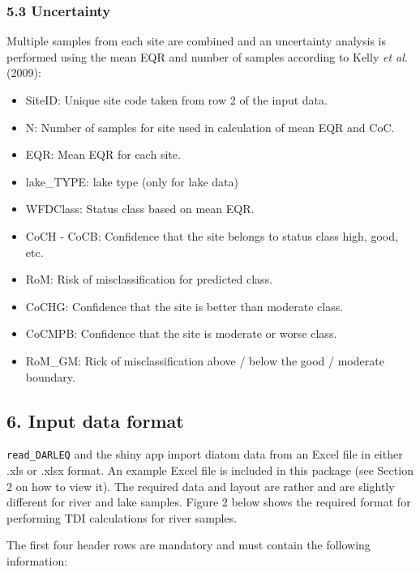 \documentclass[]{article}
\begin{document}
\hypertarget{uncertainty}{%
\subsubsection{5.3 Uncertainty}\label{uncertainty}}

Multiple samples from each site are combined and an uncertainty analysis
is performed using the mean EQR and number of samples according to Kelly
\emph{et al}. (2009):

\begin{itemize}
\item
  SiteID: Unique site code taken from row 2 of the input data.
\item
  N: Number of samples for site used in calculation of mean EQR and CoC.
\item
  EQR: Mean EQR for each site.
\item
  lake\_TYPE: lake type (only for lake data)
\item
  WFDClass: Status class based on mean EQR.
\item
  CoCH - CoCB: Confidence that the site belongs to status class high,
  good, etc.
\item
  RoM: Risk of misclassification for predicted class.
\item
  CoCHG: Confidence that the site is better than moderate class.
\item
  CoCMPB: Confidence that the site is moderate or worse class.
\item
  RoM\_GM: Rick of misclassification above / below the good / moderate
  boundary.
\end{itemize}

\hypertarget{input-data-format}{%
\subsection{6. Input data format}\label{input-data-format}}

\texttt{read\_DARLEQ} and the shiny app import diatom data from an Excel
file in either .xls or .xlsx format. An example Excel file is included
in this package (see Section 2 on how to view it). The required data and
layout are rather and are slightly different for river and lake samples.
Figure 2 below shows the required format for performing TDI calculations
for river samples.

The first four header rows are mandatory and must contain the following
information:
\end{document}

